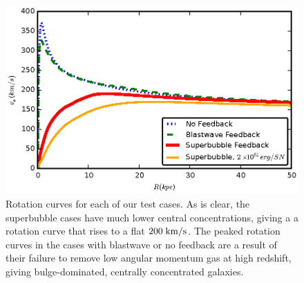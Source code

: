 \begin{figure}
    \includegraphics[width=\columnwidth]{figures2/rotation_curve.eps}
    \caption[Rotation curves with different feedback models]{Rotation curves for
    each of our test cases.  As is clear, the superbubble cases have much lower
    central concentrations, giving a a rotation curve that rises to a flat
    $200\; \rm{km/s}$.  The peaked rotation curves in the cases with blastwave
    or no feedback are a result of their failure to remove low angular momentum
    gas at high redshift, giving bulge-dominated, centrally concentrated
    galaxies.}
    \label{rotation_curve}
\end{figure}
